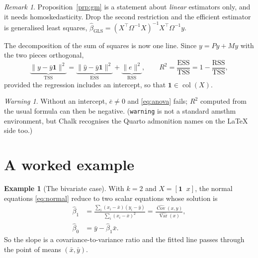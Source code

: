 \documentclass[11pt]{article}
\theoremstyle{definition}
\newtheorem{example}[theorem]{Example}
\theoremstyle{remark}
\newtheorem*{remark}{Remark}
\newtheorem*{warning}{Warning}
\begin{document}
\begin{remark}
Proposition~\ref{prp:gm} is a statement about \emph{linear} estimators only, and it needs homoskedasticity. Drop the second restriction and the efficient estimator is generalised least squares, $\hat\beta_{\mathrm{GLS}} = (X^\top \Omega^{-1} X)^{-1} X^\top \Omega^{-1} y$.
\end{remark}

The decomposition of the sum of squares is now one line. Since $y = Py + My$ with the two pieces orthogonal,
\begin{equation}
    \underbrace{\|y - \bar y \mathbf{1}\|^2}_{\text{TSS}}
      = \underbrace{\|\hat y - \bar y \mathbf{1}\|^2}_{\text{ESS}}
      + \underbrace{\|e\|^2}_{\text{RSS}} ,
    \qquad R^2 = \frac{\text{ESS}}{\text{TSS}}
               = 1 - \frac{\text{RSS}}{\text{TSS}} ,
    \label{eq:anova}
\end{equation}
provided the regression includes an intercept, so that $\mathbf{1} \in \operatorname{col}(X)$.

\begin{warning}
Without an intercept, $\bar e \neq 0$ and \eqref{eq:anova} fails; $R^2$
computed from the usual formula can then be negative. (\texttt{warning} is not a standard amsthm environment, but Chalk recognises the Quarto admonition names on the \LaTeX{} side too.)
\end{warning}

\section{A worked example}
\label{sec:example}

\begin{example}[The bivariate case]\label{exm:bivariate}
With $k = 2$ and $X = [\mathbf{1} \;\; x]$, the normal equations
\eqref{eq:normal} reduce to two scalar equations whose solution is
\begin{align}
    \hat\beta_1 &= \frac{\sum_i (x_i - \bar x)(y_i - \bar y)}
                        {\sum_i (x_i - \bar x)^2}
                 = \frac{\widehat{\operatorname{Cov}}(x, y)}
                        {\widehat{\operatorname{Var}}(x)}, \\
    \hat\beta_0 &= \bar y - \hat\beta_1 \bar x .
    \label{eq:bivariate}
\end{align}
So the slope is a covariance-to-variance ratio and the fitted line passes through the point of means $(\bar x, \bar y)$.
\end{example}
\end{document}
